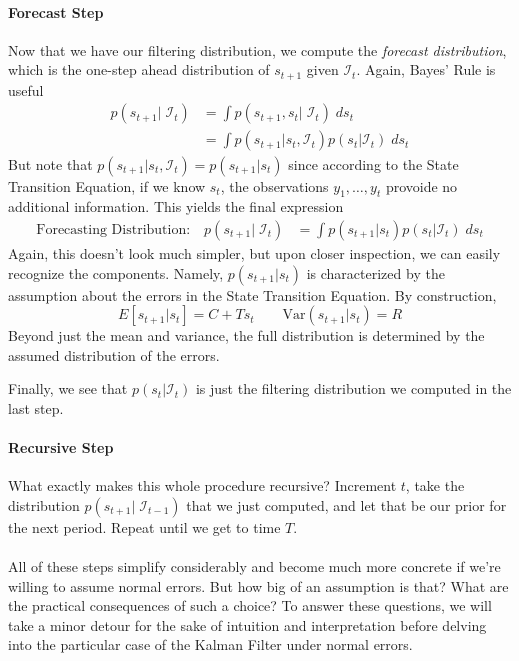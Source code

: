\documentclass[a4paper,12pt]{article}
\begin{document}
\paragraph{Forecast Step} Now that we have our filtering distribution,
we compute the \emph{forecast distribution}, which is the one-step ahead
distribution of $s_{t+1}$ given $\mathcal{I}_{t}$. Again, Bayes' Rule is
useful
\begin{align*}
  p(s_{t+1} | \; \mathcal{I}_{t}) &=
    \int p(s_{t+1}, s_t |\; \mathcal{I}_{t}) \; ds_t \\
  &= \int p(s_{t+1} |  s_t, \mathcal{I}_{t})
    p(s_t |  \mathcal{I}_{t}) \; ds_t
\end{align*}
But note that $p(s_{t+1} | s_t, \mathcal{I}_{t}) = p(s_{t+1}|s_t)$ since according to the State Transition Equation, if we know $s_{t}$, the observations $y_1, \ldots, y_t$ provoide no additional information. This yields the final expression
\begin{align}
  \text{Forecasting Distribution:} \quad
  p(s_{t+1} | \; \mathcal{I}_{t})
  &= \int p(s_{t+1} |  s_t)
    p(s_t |  \mathcal{I}_{t}) \; ds_t
\end{align}
Again, this doesn't look much simpler, but upon closer inspection, we
can easily recognize the components. Namely, $p(s_{t+1}|s_t)$ is
characterized by the assumption about the errors in the State Transition
Equation. By construction,
\[
  E[s_{t+1}|s_t] = C + Ts_t
  \qquad
  \text{Var}(s_{t+1}|s_t) = R
\]
Beyond just the mean and variance, the full distribution is
determined by the assumed distribution of the errors.

Finally, we see that $p(s_t|\mathcal{I}_{t})$ is just the
filtering distribution we computed in the last step.

\paragraph{Recursive Step} What exactly makes this whole procedure recursive? Increment $t$, take the distribution $p(s_{t+1}|\;\mathcal{I}_{t-1})$ that we just computed, and let that be our prior for the next period. Repeat until we get to time $T$.
\\
\\
All of these steps simplify considerably and become much more concrete if we're willing to assume normal errors. But how big of an assumption is that? What are the practical consequences of such a choice? To answer these questions, we will take a minor detour for the sake of intuition and interpretation before delving into the particular case of the Kalman Filter under normal errors.
\end{document}
